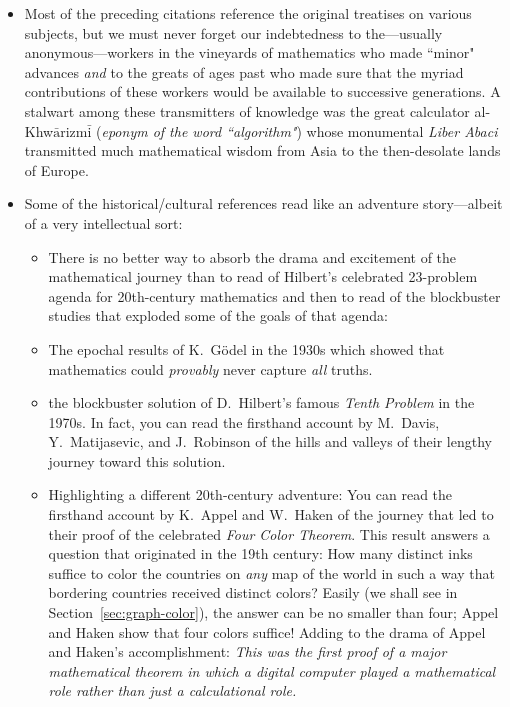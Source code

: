 \begin{description}
\begin{itemize}
\medskip\item
Most of the preceding citations reference the original treatises on
various subjects, but we must never forget our indebtedness to
the---usually anonymous---workers in the vineyards of mathematics who
made ``minor" advances {\em and} to the greats of ages past who made
sure that the myriad contributions of these workers would be available
to successive generations.  A stalwart among these transmitters of
knowledge was the great calculator al-Khw$\bar{\mbox{a}}$rizm$\bar{\mbox{i}}$ ({\em eponym of the word ``algorithm"}) whose monumental {\it Liber Abaci} transmitted much mathematical wisdom from Asia to the then-desolate lands of Europe.

\medskip\item
Some of the historical/cultural references read like an adventure story---albeit of a very intellectual sort:

\smallskip

   \begin{itemize}
   \item
There is no better way to absorb the drama and excitement of the mathematical journey than to read of Hilbert's celebrated 23-problem agenda for 20th-century mathematics and then to read of the blockbuster studies that exploded some of the goals of that agenda:

   \medskip\item
The epochal results of K.~G\"{o}del in the 1930s which showed that mathematics could {\em provably} never capture {\em all} truths.

   \medskip\item
the blockbuster solution of D.~Hilbert's famous {\em Tenth Problem} in the 1970s.  In fact, you can  read the firsthand account by M.~Davis, Y.~Matijasevic, and J.~Robinson of the hills and valleys of their lengthy journey toward this solution.

  \medskip\item
Highlighting a different 20th-century adventure:  You can read the firsthand account by K.~Appel and W.~Haken of the journey that led to their proof of the celebrated {\em Four Color Theorem}.  This result answers a question that originated in the 19th century: How many distinct inks suffice to color the countries on {\em any} map of the world in such a way that bordering countries received distinct colors?  Easily (we shall see in Section~\ref{sec:graph-color}), the answer can be no smaller than four; Appel and Haken show that four colors suffice!  Adding to the drama of Appel and Haken's accomplishment:  {\em This was the first proof of a major mathematical theorem in which a digital computer played a {\em mathematical} role rather than just a {\em calculational} role.}
   \end{itemize}
\end{itemize}


\end{description}
